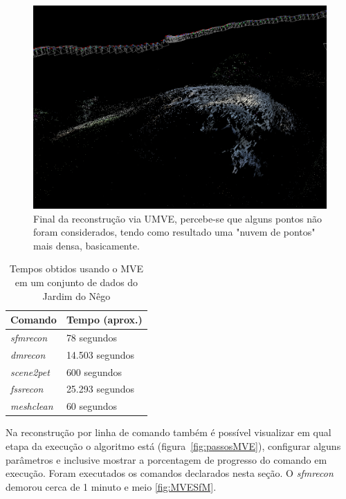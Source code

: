 \begin{figure}[!h]
	\centering
	\includegraphics[width=0.5\linewidth]{figs/umvedense.png}
	\caption{%
	Final da reconstrução via UMVE, percebe-se que alguns pontos não foram considerados, tendo como resultado uma "nuvem de pontos" mais densa, basicamente.
	}\label{fig:UMVEdense}
\end{figure} 

\begin{table}[!h]
\centering
\caption{Tempos obtidos usando o MVE em um conjunto de dados do Jardim do Nêgo}
\label{tab:mveSapo}
\begin{tabular}{|l|l|}
\hline
Comando            & Tempo (aprox.)    \\ \hline
\emph{sfmrecon}  & 78 segundos     \\ \hline
\emph{dmrecon}   & 14.503 segundos \\ \hline
\emph{scene2pet} & 600 segundos    \\ \hline
\emph{fssrecon}  & 25.293 segundos \\ \hline
\emph{meshclean} & 60 segundos     \\ \hline
\end{tabular}
\end{table}

Na reconstrução por linha de comando também é possível visualizar em qual etapa da execução o algoritmo está (figura~\ref{fig:passosMVE}), configurar alguns parâmetros e inclusive mostrar a porcentagem de progresso do comando em execução. Foram executados os comandos declarados nesta seção.  O \emph{sfmrecon} demorou cerca de 1 minuto e meio \ref{fig:MVESfM}. 

